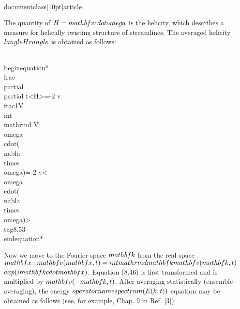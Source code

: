 \\documentclass[10pt]{article}
\begin{document}
{{{{{The quantity of $H=\\mathbf{v} \\cdot \\omega$ is the helicity, which describes a measure for helically twisting structure of streamlines. The averaged helicity $\\langle H\\rangle$ is obtained as follows:


\\begin{equation*}
\\frac{\\partial}{\\partial t}<H>=-2 v \\frac{1}{V} \\int \\mathrm{d} V \\omega \\cdot(\\nabla \\times \\omega)=-2 v<\\omega \\cdot(\\nabla \\times \\omega)> \\tag{8.53}
\\end{equation*}


Now we move to the Fourier space $\\mathbf{k}$ from the real space $\\mathbf{x}: \\mathbf{v}(\\mathbf{x}, t)=\\int \\mathrm{d} \\mathbf{k} \\mathbf{v}(\\mathbf{k}, t)$ $\\exp (i \\mathbf{k} \\cdot \\mathbf{x})$. Equation (8.46) is first transformed and is multiplied by $\\mathbf{v}(-\\mathbf{k}, t)$. After averaging statistically (ensemble averaging), the energy $\\operatorname{spectrum}(E(k, t))$ equation may be obtained as follows (see, for example, Chap. 9 in Ref. [3]):


}}}}}
\end{document}
